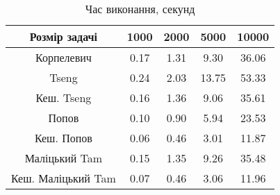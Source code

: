 \begin{table}[H]
	\centering
	\begin{tabular}{|c||c|c|c|c|}\hline
		Розмір задачі & 1000 & 2000 & 5000 & 10000 \\ \hline \hline
		Корпелевич & 0.17 & 1.31 & 9.30 & 36.06 \\ \hline
		Tseng & 0.24 & 2.03 & 13.75 & 53.33 \\ \hline
		Кеш. Tseng & 0.16 & 1.36 & 9.06 & 35.61 \\ \hline
		Попов & 0.10 & 0.90 & 5.94 & 23.53 \\ \hline
		Кеш. Попов & 0.06 & 0.46 & 3.01 & 11.87 \\ \hline
		Маліцький Tam & 0.15 & 1.35 & 9.26 & 35.48 \\ \hline
		Кеш. Маліцький Tam & 0.07 & 0.46 & 3.06 & 11.96 \\ \hline
	\end{tabular}
	\caption{Час виконання, секунд}
\end{table}
